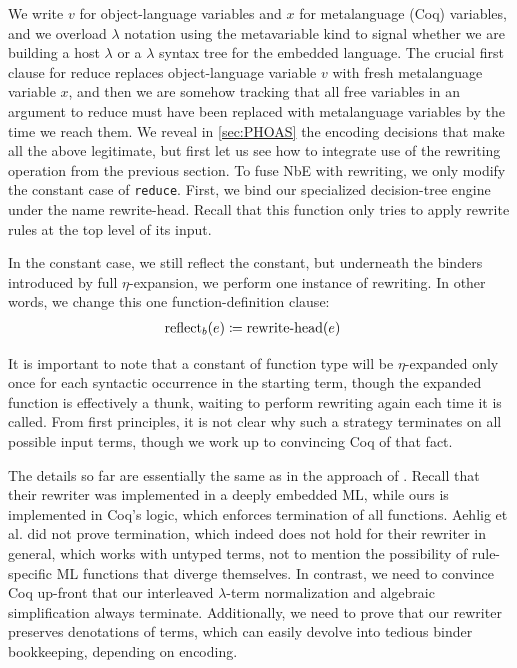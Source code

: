 We write $v$ for object-language variables and $x$ for metalanguage (Coq) variables, and we overload $\lambda$ notation using the metavariable kind to signal whether we are building a host $\lambda$ or a $\lambda$ syntax tree for the embedded language.
The crucial first clause for reduce replaces object-language variable $v$ with fresh metalanguage variable $x$, and then we are somehow tracking that all free variables in an argument to reduce must have been replaced with metalanguage variables by the time we reach them.
We reveal in \autoref{sec:PHOAS} the encoding decisions that make all the above legitimate, but first let us see how to integrate use of the rewriting operation from the previous section.
To fuse NbE with rewriting, we only modify the constant case of \texttt{reduce}.
First, we bind our specialized decision-tree engine under the name rewrite-head.
Recall that this function only tries to apply rewrite rules at the top level of its input.

In the constant case, we still reflect the constant, but underneath the binders introduced by full $\eta$-expansion, we perform one instance of rewriting.
In other words, we change this one function-definition clause:
\begin{align*}
  \text{reflect}_{b}(e) & \coloneqq \text{rewrite-head}(e)
\end{align*}

It is important to note that a constant of function type will be $\eta$-expanded only once for each syntactic occurrence in the starting term, though the expanded function is effectively a thunk, waiting to perform rewriting again each time it is called.
From first principles, it is not clear why such a strategy terminates on all possible input terms, though we work up to convincing Coq of that fact.

The details so far are essentially the same as in the approach of \textcite{Aehlig}.
Recall that their rewriter was implemented in a deeply embedded ML, while ours is implemented in Coq's logic, which enforces termination of all functions.
Aehlig et al. did not prove termination, which indeed does not hold for their rewriter in general, which works with untyped terms, not to mention the possibility of rule-specific ML functions that diverge themselves.
In contrast, we need to convince Coq up-front that our interleaved $\lambda$-term normalization and algebraic simplification always terminate.
Additionally, we need to prove that our rewriter preserves denotations of terms, which can easily devolve into tedious binder bookkeeping, depending on encoding.

